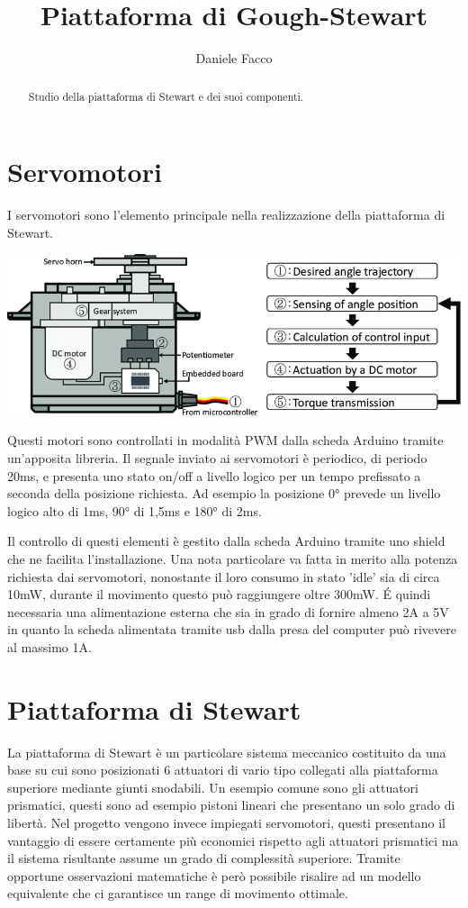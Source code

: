 \documentclass[11pt]{article}
\title{Piattaforma di Gough-Stewart}
\author{Daniele Facco}
\date{}
\begin{document}
\maketitle

\begin{abstract}
Studio della piattaforma di Stewart e dei suoi componenti.
\end{abstract}

\section{Servomotori}\label{servomotori}
I servomotori sono l'elemento principale nella realizzazione della piattaforma di Stewart.

\includegraphics[scale=0.3]{Schematic-of-an-RC-servo-motor.png}

Questi motori sono controllati in modalità PWM dalla scheda Arduino tramite un'apposita libreria. Il segnale inviato ai servomotori è periodico, di periodo 20ms, e presenta uno stato on/off a livello logico per un tempo prefissato a seconda della posizione richiesta. Ad esempio la posizione 0° prevede un livello logico alto di 1ms, 90° di 1,5ms e 180° di 2ms.

Il controllo di questi elementi è gestito dalla scheda Arduino tramite uno shield che ne facilita l'installazione. Una nota particolare va fatta in merito alla potenza richiesta dai servomotori, nonostante il loro consumo in stato 'idle' sia di circa 10mW, durante il movimento questo può raggiungere oltre 300mW. É quindi necessaria una alimentazione esterna che sia in grado di fornire almeno 2A a 5V in quanto la scheda alimentata tramite usb dalla presa del computer può rivevere al massimo 1A.

\section{Piattaforma di Stewart}\label{piattaformastewart}
La piattaforma di Stewart è un particolare sistema meccanico costituito da una base su cui sono posizionati 6 attuatori di vario tipo collegati alla piattaforma superiore mediante giunti snodabili. Un esempio comune sono gli attuatori prismatici, questi sono ad esempio pistoni lineari che presentano un solo grado di libertà. Nel progetto vengono invece impiegati servomotori, questi presentano il vantaggio di essere certamente più economici rispetto agli attuatori prismatici ma il sistema risultante assume un grado di complessità superiore. Tramite opportune osservazioni matematiche è però possibile risalire ad un modello equivalente che ci garantisce un range di movimento ottimale.
\end{document}
